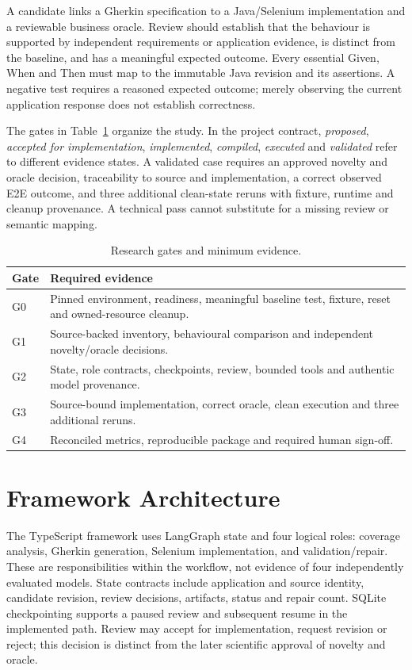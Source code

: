 \documentclass[pdflatex,sn-mathphys-num]{sn-jnl}
\begin{document}
A candidate links a Gherkin specification to a Java/Selenium implementation and a reviewable business oracle. Review should establish that the behaviour is supported by independent requirements or application evidence, is distinct from the baseline, and has a meaningful expected outcome. Every essential Given, When and Then must map to the immutable Java revision and its assertions. A negative test requires a reasoned expected outcome; merely observing the current application response does not establish correctness.

The gates in Table~\ref{tab:gates} organize the study. In the project contract, \emph{proposed}, \emph{accepted for implementation}, \emph{implemented}, \emph{compiled}, \emph{executed} and \emph{validated} refer to different evidence states. A validated case requires an approved novelty and oracle decision, traceability to source and implementation, a correct observed E2E outcome, and three additional clean-state reruns with fixture, runtime and cleanup provenance. A technical pass cannot substitute for a missing review or semantic mapping.
\begin{table}[htbp]\caption{Research gates and minimum evidence.}\label{tab:gates}
\begin{tabular}{@{}lp{10.5cm}@{}}\toprule
Gate & Required evidence \\\midrule
G0 & Pinned environment, readiness, meaningful baseline test, fixture, reset and owned-resource cleanup. \\
G1 & Source-backed inventory, behavioural comparison and independent novelty/oracle decisions. \\
G2 & State, role contracts, checkpoints, review, bounded tools and authentic model provenance. \\
G3 & Source-bound implementation, correct oracle, clean execution and three additional reruns. \\
G4 & Reconciled metrics, reproducible package and required human sign-off. \\\bottomrule
\end{tabular}\end{table}

\section{Framework Architecture}\label{sec:architecture}
The TypeScript framework uses LangGraph state and four logical roles: coverage analysis, Gherkin generation, Selenium implementation, and validation/repair. These are responsibilities within the workflow, not evidence of four independently evaluated models. State contracts include application and source identity, candidate revision, review decisions, artifacts, status and repair count. SQLite checkpointing supports a paused review and subsequent resume in the implemented path. Review may accept for implementation, request revision or reject; this decision is distinct from the later scientific approval of novelty and oracle.
\end{document}
